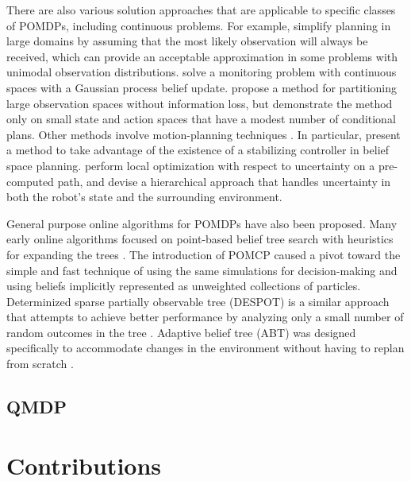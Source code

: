 There are also various solution approaches that are applicable to specific classes of POMDPs, including continuous problems.
For example, \citet{platt2010belief} simplify planning in large domains by assuming that the most likely observation will always be received, which can provide an acceptable approximation in some problems with unimodal observation distributions.
\citet{morere2016bayesian} solve a monitoring problem with continuous spaces with a Gaussian process belief update.
\citet{hoey2005solving} propose a method for partitioning large observation spaces without information loss, but demonstrate the method only on small state and action spaces that have a modest number of conditional plans.
Other methods involve motion-planning techniques \cite{melchior2007particle,prentice2009belief,bry2011rapidly}.
In particular, \citet{agha2011firm} present a method to take advantage of the existence of a stabilizing controller in belief space planning.
\citet{van2012motion} perform local optimization with respect to uncertainty on a pre-computed path, and \citet{indelman2015planning} devise a hierarchical approach that handles uncertainty in both the robot's state and the surrounding environment.

General purpose online algorithms for POMDPs have also been proposed.
Many early online algorithms focused on point-based belief tree search with heuristics for expanding the trees \cite{ross2008online}.
The introduction of POMCP \cite{silver2010pomcp} caused a pivot toward the simple and fast technique of using the same simulations for decision-making and using beliefs implicitly represented as unweighted collections of particles.
Determinized sparse partially observable tree (DESPOT) is a similar approach that attempts to achieve better performance by analyzing only a small number of random outcomes in the tree \cite{somani2013despot}.
Adaptive belief tree (ABT) was designed specifically to accommodate changes in the environment without having to replan from scratch \cite{kurniawati2016online}.

\subsection{QMDP} \label{sec:qmdp}


\section{Contributions}
